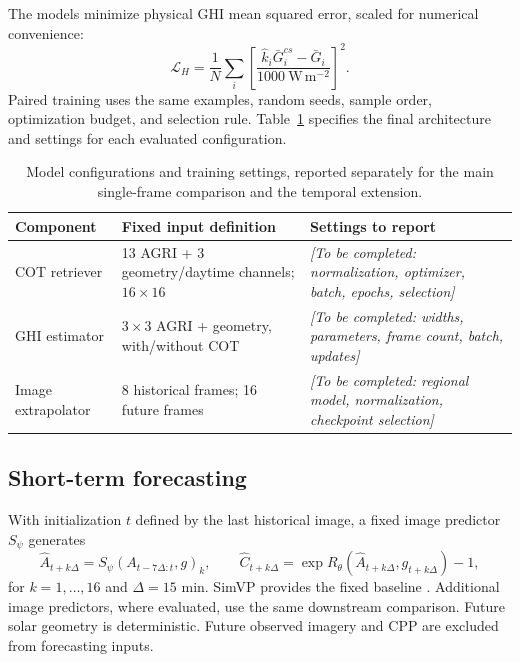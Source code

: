 \documentclass[11pt]{article}
\newcommand{\pending}[1]{\textit{[To be completed: #1]}}
\begin{document}
The models minimize physical GHI mean squared error, scaled for numerical convenience:
\begin{equation}
\mathcal L_H=\frac1N\sum_i\left[\frac{\widehat k_i\bar G^{cs}_i-\bar G_i}{1000\ \mathrm{W\,m^{-2}}}\right]^2.
\label{eq:ghi-loss}
\end{equation}
Paired training uses the same examples, random seeds, sample order, optimization budget, and selection rule. Table~\ref{tab:training} specifies the final architecture and settings for each evaluated configuration.
\begin{table}[!htbp]\centering\small
\caption{Model configurations and training settings, reported separately for the main single-frame comparison and the temporal extension.}\label{tab:training}
\begin{tabularx}{\linewidth}{lXX}\toprule
Component & Fixed input definition & Settings to report\\\midrule
COT retriever & 13 AGRI + 3 geometry/daytime channels; $16\times16$ & \pending{normalization, optimizer, batch, epochs, selection}\\
GHI estimator & $3\times3$ AGRI + geometry, with/without COT & \pending{widths, parameters, frame count, batch, updates}\\
Image extrapolator & 8 historical frames; 16 future frames & \pending{regional model, normalization, checkpoint selection}\\\bottomrule
\end{tabularx}\end{table}

\subsection{Short-term forecasting}
With initialization $t$ defined by the last historical image, a fixed image predictor $S_\psi$ generates
\begin{equation}
\widehat A_{t+k\Delta}=S_\psi(A_{t-7\Delta:t},g)_{k},\qquad
\widehat C_{t+k\Delta}=\exp R_\theta(\widehat A_{t+k\Delta},g_{t+k\Delta})-1,
\label{eq:forecast}
\end{equation}
for $k=1,\ldots,16$ and $\Delta=15$ min. SimVP provides the fixed baseline \cite{simvp,simvpv2}. Additional image predictors, where evaluated, use the same downstream comparison. Future solar geometry is deterministic. Future observed imagery and CPP are excluded from forecasting inputs.
\end{document}

